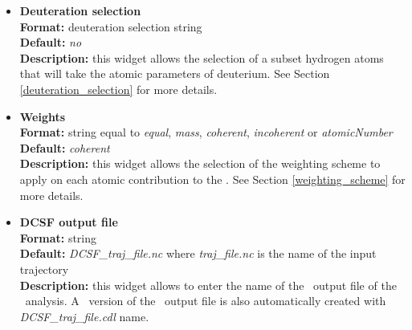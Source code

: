 \documentclass[a4paper,11pt]{report}
\begin{document}
\begin{itemize}
\hypertarget{dcsf_deuteration_selection}{}
\item \textbf{Deuteration selection}\\
\textbf{Format:} deuteration selection string\\
\textbf{Default:} \textit{no}\\
\textbf{Description:} this widget allows the selection of a subset hydrogen atoms that will take the atomic parameters 
of deuterium. See Section \ref{deuteration_selection} for more details.

\hypertarget{dcsf_weights}{}
\item \textbf{Weights}\\
\textbf{Format:} string equal to \textit{equal}, \textit{mass}, \textit{coherent}, \textit{incoherent} or \textit{atomicNumber}\\
\textbf{Default:} \textit{coherent}\\
\textbf{Description:} this widget allows the selection of the weighting scheme to apply on each atomic contribution 
to the \DCSF . See Section \ref{weighting_scheme} for more details. 

\hypertarget{dcsf_dcsf_output_file}{}
\item \textbf{DCSF output file}\\
\textbf{Format:} string\\
\textbf{Default:} \textit{DCSF\_traj\_file.nc} where \textit{traj\_file.nc} is the name of the input trajectory\\
\textbf{Description:} this widget allows to enter the name of the \NetCDF\ output file of the \DCSF\ analysis. A \CDL\ 
version of the \NetCDF\ output file is also automatically created with \textit{DCSF\_traj\_file.cdl} name.
\end{itemize}
\end{document}
